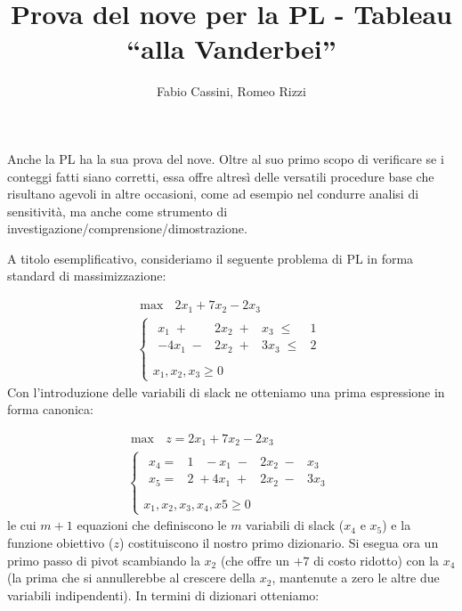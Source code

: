 \documentclass{article}
\title{Prova del nove per la PL - Tableau ``alla Vanderbei''}
\author{Fabio Cassini, Romeo Rizzi}
\begin{document}
\maketitle

  	Anche la PL ha la sua prova del nove. Oltre al suo primo scopo di verificare se i conteggi fatti siano corretti, essa offre altresì delle versatili procedure base che risultano agevoli in altre occasioni, come ad esempio nel condurre analisi di sensitività, ma anche come strumento di investigazione/comprensione/dimostrazione. 
  	
  	A titolo esemplificativo, consideriamo il seguente problema di PL in forma standard di massimizzazione:
  	
  	\[
	  	\begin{array}{l}
		  	\max \mbox{\ }2x_1 + 7x_2 -2x_3\\
		  	\left\{
		  	\begin{array}{l}
		  	\begin{array}{rrrr}
		  	x_1 \;+&  2x_2 \;+&  x_3 \;\leq &   1 \\
		  	-4x_1 \;-& 2x_2 \;+& 3x_3 \;\leq &   2 \\
		  	\end{array} \\
		  	x_1, x_2, x_3  \geq 0    
		  	\end{array}
		  	\right.
	  	\end{array}
  	\]
  	Con l'introduzione delle variabili di slack ne otteniamo una prima espressione in forma canonica:

  	\[
	  	\begin{array}{l}
		  	\max \mbox{\ }z = 2x_1 + 7x_2 -2x_3\\
		  	\left\{
		  	\begin{array}{l}
		  	\begin{array}{rrrr}
		  	x_4 =& 1 \;\;\;-x_1 \;-&  2x_2 \;-&  x_3 \\
		  	x_5 =& 2 \;+4x_1 \;+& 2x_2 \;-& 3x_3 \\
		  	\end{array} \\
		  	x_1, x_2, x_3, x_4, x5  \geq 0    
		  	\end{array}
		  	\right.
	  	\end{array}
      \]
      le cui $m+1$ equazioni che definiscono le $m$ variabili di slack ($x_4$ e $x_5$) e la funzione obiettivo ($z$) costituiscono il nostro primo dizionario. Si esegua ora un primo passo di pivot scambiando la $x_2$ (che offre un $+7$ di costo ridotto) con la $x_4$ (la prima che si annullerebbe al crescere della $x_2$, mantenute a zero le altre due variabili indipendenti). In termini di dizionari otteniamo:
  	
\end{document}
